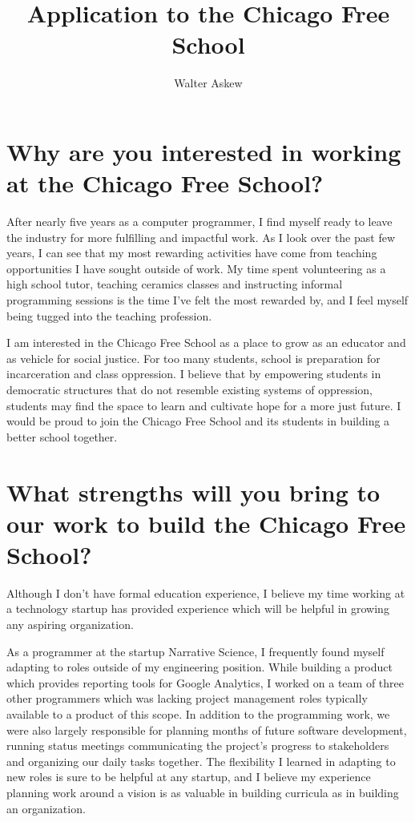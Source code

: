 \documentclass[oneside]{memoir}
\author{Walter Askew}
\title{Application to the Chicago Free School}
\begin{document}
\maketitle

\section*{Why are you interested in working at the Chicago Free
  School?}
After nearly five years as a computer programmer, I find myself ready
to leave the industry for more fulfilling and impactful work.
As I look over the past few years, I can see that my most
rewarding activities have come from teaching opportunities I have
sought outside of work.
My time spent volunteering as a high school tutor, teaching ceramics
classes and instructing informal programming sessions is the time I've
felt the most rewarded by, and I feel myself being tugged into the
teaching profession.

I am interested in the Chicago Free School as a place to grow as an
educator and as vehicle for social justice.
For too many students, school is preparation for incarceration and
class oppression.
I believe that by empowering students in democratic structures that do
not resemble existing systems of oppression, students may find the
space to learn and cultivate hope for a more just future.
I would be proud to join the Chicago Free School and its students in
building a better school together.

\section*{What strengths will you bring to our work to build the
  Chicago Free School?} 
Although I don't have formal education experience, I believe my time
working at a technology startup has provided experience which will be
helpful in growing any aspiring organization.

As a programmer at the startup Narrative Science, I frequently found
myself adapting to roles outside of my engineering position.
While building a product which provides reporting tools for Google
Analytics, I worked on a team of three other programmers which was
lacking project management roles typically available to a product of
this scope.
In addition to the programming work, we were also largely responsible
for planning months of future software development, running status
meetings communicating the project's progress to stakeholders and
organizing our daily tasks together.
The flexibility I learned in adapting to new roles is sure to be
helpful at any startup, and I believe my experience planning work
around a vision is as valuable in building curricula as in building an
organization.
\end{document}
